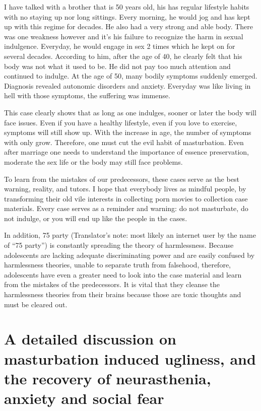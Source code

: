 \documentclass[
]{book}
\begin{document}
I have talked with a brother that is 50 years old, his has regular lifestyle habits with no staying up nor long sittings. Every morning, he would jog and has kept up with this regime for decades. He also had a very strong and able body. There was one weakness however and it's his failure to recognize the harm in sexual indulgence. Everyday, he would engage in sex 2 times which he kept on for several decades. According to him, after the age of 40, he clearly felt that his body was not what it used to be. He did not pay too much attention and continued to indulge. At the age of 50, many bodily symptoms suddenly emerged. Diagnosis revealed autonomic disorders and anxiety. Everyday was like living in hell with those symptoms, the suffering was immense.

This case clearly shows that as long as one indulges, sooner or later the body will face issues. Even if you have a healthy lifestyle, even if you love to exercise, symptoms will still show up. With the increase in age, the number of symptoms with only grow. Therefore, one must cut the evil habit of masturbation. Even after marriage one needs to understand the importance of essence preservation, moderate the sex life or the body may still face problems.

To learn from the mistakes of our predecessors, these cases serve as the best warning, reality, and tutors. I hope that everybody lives as mindful people, by transforming their old vile interests in collecting porn movies to collection case materials. Every case serves as a reminder and warning: do not masturbate, do not indulge, or you will end up like the people in the cases.

In addition, 75 party (Translator's note: most likely an internet user by the name of ``75 party'') is constantly spreading the theory of harmlessness. Because adolescents are lacking adequate discriminating power and are easily confused by harmlessness theories, unable to separate truth from falsehood, therefore, adolescents have even a greater need to look into the case material and learn from the mistakes of the predecessors. It is vital that they cleanse the harmlessness theories from their brains because those are toxic thoughts and must be cleared out.

\hypertarget{a-detailed-discussion-on-masturbation-induced-ugliness-and-the-recovery-of-neurasthenia-anxiety-and-social-fear}{%
\chapter{A detailed discussion on masturbation induced ugliness, and the recovery of neurasthenia, anxiety and social fear}\label{a-detailed-discussion-on-masturbation-induced-ugliness-and-the-recovery-of-neurasthenia-anxiety-and-social-fear}}
\end{document}
